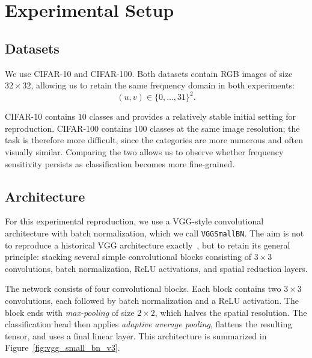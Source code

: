 \section{Experimental Setup}

\subsection{Datasets}

We use CIFAR-10 and CIFAR-100. Both datasets contain RGB images of
size $32\times32$, allowing us to retain the same frequency domain in both experiments:
\[
    (u,v) \in \{0,\dots,31\}^2.
\]

CIFAR-10 contains $10$ classes and provides a relatively stable initial setting for reproduction.
CIFAR-100 contains $100$ classes at the same image resolution; the task is therefore more difficult,
since the categories are more numerous and often visually similar. Comparing the
two allows us to observe whether frequency sensitivity persists as classification becomes more fine-grained.

\subsection{Architecture}

For this experimental reproduction, we use a VGG-style convolutional architecture
with batch normalization, which we call \texttt{VGGSmallBN}. The aim is not to reproduce
a historical VGG architecture exactly~\cite{simonyan2015very}, but to retain its general
principle: stacking several simple convolutional blocks consisting of $3\times3$ convolutions,
batch normalization, ReLU activations, and spatial reduction layers.

The network consists of four convolutional blocks. Each block contains two
$3\times3$ convolutions, each followed by batch normalization and a ReLU activation. The block ends
with \textit{max-pooling} of size $2\times2$, which halves the spatial resolution. The
classification head then applies \textit{adaptive average pooling}, flattens the resulting tensor, and
uses a final linear layer. This architecture is summarized in Figure~\ref{fig:vgg_small_bn_v3}.

